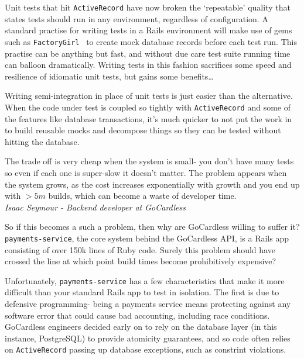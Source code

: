 \documentclass[11pt]{article}
\begin{document}
Unit tests that hit \texttt{ActiveRecord} have now broken the `repeatable' quality that
states tests should run in any environment, regardless of configuration. A
standard practise for writing tests in a Rails environment will make use of gems
such as \texttt{FactoryGirl}~\cite{factoryGirl} to create mock database records
before each test run. This practise can be anything but fast, and without due
care test suite running time can balloon dramatically. Writing tests in this
fashion sacrifices some speed and resilience of idiomatic unit tests, but gains
some benefits\dots

\begin{displayquote}

  Writing semi-integration in place of unit tests is just easier than the
  alternative. When the code under test is coupled so tightly with
  \texttt{ActiveRecord} and some of the features like database transactions,
  it's much quicker to not put the work in to build reusable mocks and decompose
  things so they can be tested without hitting the database.

  The trade off is very cheap when the system is small- you don't have many
  tests so even if each one is super-slow it doesn't matter. The problem appears
  when the system grows, as the cost increases exponentially with growth and you
  end up with $>5m$ builds, which can become a waste of developer time. \\

  \textit{Isaac Seymour - Backend developer at GoCardless}

\end{displayquote}

So if this becomes a such a problem, then why are GoCardless willing to suffer it?
\texttt{payments-service}, the core system behind the GoCardless API, is a Rails app
consisting of over 150k lines of Ruby code. Surely this problem should have
crossed the line at which point build times become prohibitively expensive?

Unfortunately, \texttt{payments-service} has a few characteristics that make it
more difficult than your standard Rails app to test in isolation. The first is
due to defensive programming- being a payments service means protecting against
any software error that could cause bad accounting, including race conditions.
GoCardless engineers decided early on to rely on the database layer (in this
instance, PostgreSQL) to provide atomicity guarantees, and so code often relies
on \texttt{ActiveRecord} passing up database exceptions, such as constrint
violations.
\end{document}
